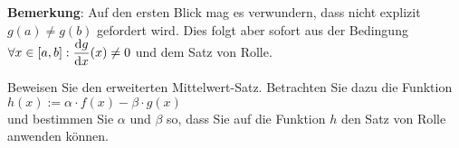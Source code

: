 \noindent
\textbf{Bemerkung}: Auf den ersten Blick mag es verwundern, dass nicht explizit 
$g(a) \not = g(b)$ gefordert wird.  Dies folgt aber sofort aus der Bedingung
$\forall x \in [a,b]:\displaystyle\frac{\textrm{d}g}{\textrm{d}x}(x) \not= 0$ und dem Satz von Rolle. \eox
\vspace*{0.3cm}

\exercise
Beweisen Sie den erweiterten Mittelwert-Satz.  Betrachten Sie dazu die Funktion
\\[0.2cm]
\hspace*{1.3cm}
$h(x) := \alpha \cdot f(x) - \beta \cdot g(x)$
\\[0.2cm]
und bestimmen Sie $\alpha$ und $\beta$ so, dass Sie auf die Funktion $h$ den Satz von Rolle anwenden k\"onnen. \eox
\vspace*{0.3cm}


